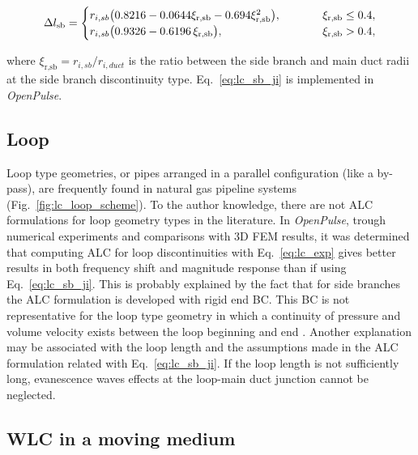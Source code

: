 \documentclass[12pt]{article}
\begin{document}
\begin{equation} \label{eq:lc_sb_ji}
	\Delta l_{\text{sb}} = 
	\begin{cases}
		r_{i,sb} \big( 0.8216 - 0.0644  \xi_{\text{r,sb}}  - 0.694  \xi_{\text{r,sb}} ^2 \big), \hspace{10mm} & \xi_{\text{r,sb}} \leq 0.4, \\
		r_{i,sb} \big( 0.9326 -0.6196 \, \xi_{\text{r,sb}} \big),  &  \xi_{\text{r,sb}} > 0.4,
	\end{cases}
\end{equation}

\noindent where $\xi_{\text{r,sb}}= r_{i,sb}/ r_{i, duct}$ is the ratio between the side branch and main duct radii at the side branch discontinuity type. Eq.~\ref{eq:lc_sb_ji}  is implemented in \textit{OpenPulse}.

\subsection{Loop}

Loop type geometries, or pipes arranged in a parallel configuration (like a by-pass), are frequently found in natural gas pipeline systems (Fig.~\ref{fig:lc_loop_scheme}). To the author knowledge, there are not \acrshort{ALC} formulations for loop geometry types in the literature. In \textit{OpenPulse}, trough numerical experiments and comparisons with 3D \acrshort{FEM} results, it was determined that computing \acrshort{ALC} for loop discontinuities with Eq.~\ref{eq:lc_exp} gives better results in both frequency shift and magnitude response than if using Eq.~\ref{eq:lc_sb_ji}. This is probably explained by the fact that for side branches the \acrshort{ALC} formulation is developed with rigid end \acrshort{BC}. This \acrshort{BC} is not representative for the loop type geometry in which a continuity of pressure and volume velocity exists between the loop beginning and end \cite[see Fig.~2 and Eqs.~12~to~24 in][]{TO_1}. Another explanation may be associated with the loop length and the assumptions made in the \acrshort{ALC} formulation related with Eq.~\ref{eq:lc_sb_ji}. If the loop length is not sufficiently long, evanescence waves effects at the loop-main duct junction cannot be neglected.

\subsection{\acrshort{WLC} in a moving medium} 
\end{document}
